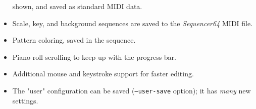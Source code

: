 \documentclass[
 11pt,
 twoside,
 a4paper,
 headinclude,
 footinclude,
 final                                 %
]{article}
\begin{document}
\begin{itemize}
         shown, and saved as standard MIDI data.
      \item Scale, key, and background sequences
         are saved to the \textsl{Sequencer64} MIDI file.
      \item Pattern coloring, saved in the sequence.
      \item Piano roll scrolling to keep up with the progress bar.
      \item Additional mouse and keystroke support for faster editing.
      \item The "user" configuration can be saved
         (\texttt{--user-save} option); it has \textsl{many} new settings.

\end{itemize}
\end{document}
